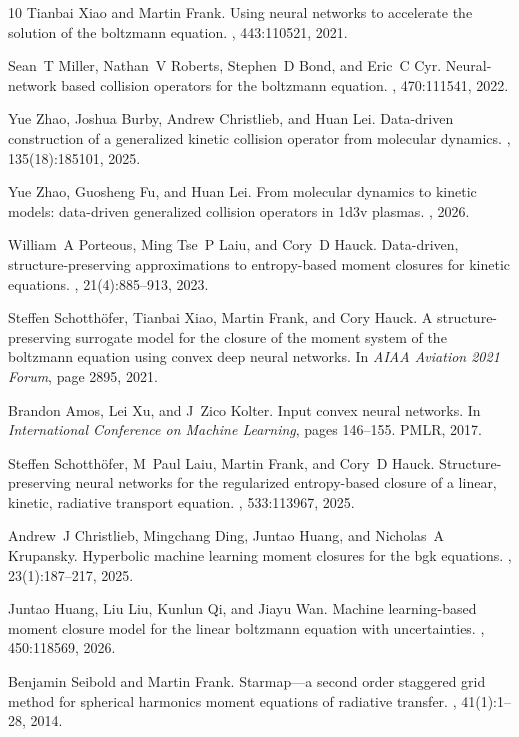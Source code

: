 \documentclass[11pt]{article}
\numberwithin{equation}{section}
\begin{document}
\begin{thebibliography}{10}
Tianbai Xiao and Martin Frank.
\newblock Using neural networks to accelerate the solution of the boltzmann
  equation.
, 443:110521, 2021.

Sean~T Miller, Nathan~V Roberts, Stephen~D Bond, and Eric~C Cyr.
\newblock Neural-network based collision operators for the boltzmann equation.
, 470:111541, 2022.

Yue Zhao, Joshua Burby, Andrew Christlieb, and Huan Lei.
\newblock Data-driven construction of a generalized kinetic collision operator
  from molecular dynamics.
, 135(18):185101, 2025.

Yue Zhao, Guosheng Fu, and Huan Lei.
\newblock From molecular dynamics to kinetic models: data-driven generalized
  collision operators in 1d3v plasmas.
, 2026.

William~A Porteous, Ming Tse~P Laiu, and Cory~D Hauck.
\newblock Data-driven, structure-preserving approximations to entropy-based
  moment closures for kinetic equations.
, 21(4):885--913, 2023.

Steffen Schotth{\"o}fer, Tianbai Xiao, Martin Frank, and Cory Hauck.
\newblock A structure-preserving surrogate model for the closure of the moment
  system of the boltzmann equation using convex deep neural networks.
\newblock In {\em AIAA Aviation 2021 Forum}, page 2895, 2021.

Brandon Amos, Lei Xu, and J~Zico Kolter.
\newblock Input convex neural networks.
\newblock In {\em International Conference on Machine Learning}, pages
  146--155. PMLR, 2017.

Steffen Schotth{\"o}fer, M~Paul Laiu, Martin Frank, and Cory~D Hauck.
\newblock Structure-preserving neural networks for the regularized
  entropy-based closure of a linear, kinetic, radiative transport equation.
, 533:113967, 2025.

Andrew~J Christlieb, Mingchang Ding, Juntao Huang, and Nicholas~A Krupansky.
\newblock Hyperbolic machine learning moment closures for the bgk equations.
, 23(1):187--217, 2025.

Juntao Huang, Liu Liu, Kunlun Qi, and Jiayu Wan.
\newblock Machine learning-based moment closure model for the linear boltzmann
  equation with uncertainties.
,
  450:118569, 2026.

Benjamin Seibold and Martin Frank.
\newblock Starmap---a second order staggered grid method for spherical
  harmonics moment equations of radiative transfer.
, 41(1):1--28,
  2014.

\end{thebibliography}
\end{document}
